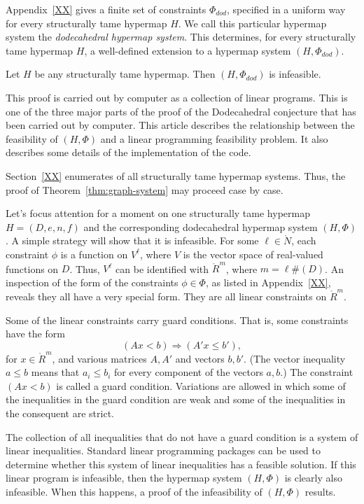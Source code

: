 Appendix~\ref{XX} gives a finite set of constraints $\Phi_{dod}$, 
specified
in a uniform way for every structurally tame hypermap $H$.  
We call this particular hypermap system
the {\it dodecahedral hypermap system}. 
This determines,
for every structurally tame hypermap $H$, a well-defined extension
to a hypermap system $(H,\Phi_{dod})$.   


\begin{theorem}\label{thm:graph-system}  Let 
$H$ be any structurally tame hypermap. 
Then $(H,\Phi_{dod})$ is infeasible.
\end{theorem}

This proof is carried out by computer as a collection of linear
programs.  This is one of the three major parts of the proof
of the Dodecahedral conjecture that has been carried out by computer.
This article describes the relationship between the
feasibility of $(H,\Phi)$ and a linear programming feasibility
problem.  It also describes some details of the implementation of 
the code.

Section~\ref{XX} enumerates of all structurally tame
hypermap systems.  Thus, the proof of
Theorem~\ref{thm:graph-system} may proceed case by case.


Let's focus attention for a moment on one structurally tame hypermap $H=(D,e,n,f)$ and the corresponding dodecahedral hypermap system $(H,\Phi)$.
A simple strategy will show that it is infeasible.
For some $\ell\in\ring{N}$,
each constraint $\phi$ is a function on $V^\ell$, where $V$ is
the vector space of real-valued functions on $D$.  Thus,
$V^\ell$ can be identified with $\ring{R}^m$, where $m= \ell \#(D)$.
An inspection of the form of the constraints $\phi\in \Phi$, as listed
in Appendix~\ref{XX}, reveals they all have a 
very special form.  They are all linear constraints
on $\ring{R}^m$.  

Some of the linear constraints
carry guard conditions.  That is, some constraints have the form
  \begin{equation}\label{eqn:guard}
  (A x < b)  \Rightarrow (A' x \le b'),
  \end{equation}
for $x\in\ring{R}^m$, and various matrices $A,A'$ and vectors
$b,b'$.  (The vector inequality $a \le b$ means
that $a_i\le b_i$ for every component of the vectors $a,b$.)
The constraint $(A x < b)$ is called a guard condition.
Variations are allowed in which some of the inequalities in the
guard condition are weak and some of the inequalities in the
consequent are strict.

The collection of all inequalities that do not have a guard 
condition is a system of linear inequalities.  Standard linear
programming packages can be used to determine whether this
system of linear inequalities has a feasible solution.  If this
linear program is infeasible, then the hypermap system $(H,\Phi)$
is clearly also infeasible.  When this happens, a
proof of the infeasibility of $(H,\Phi)$ results.

